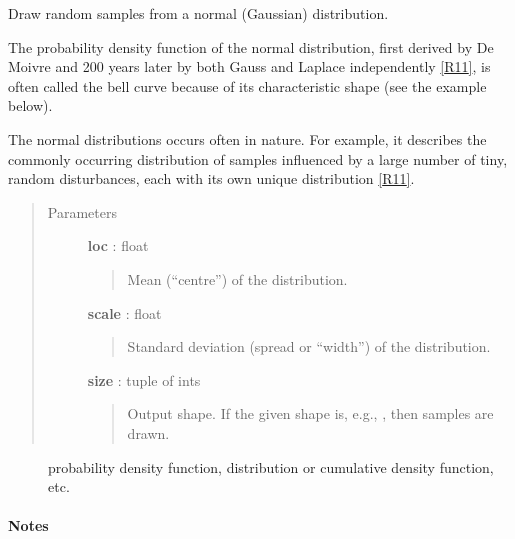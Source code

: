 \documentclass[letterpaper,10pt,english]{sphinxmanual}
\begin{document}
\begin{fulllineitems}
\label{index:halla.test.normal}
Draw random samples from a normal (Gaussian) distribution.

The probability density function of the normal distribution, first
derived by De Moivre and 200 years later by both Gauss and Laplace
independently {\hyperref[index:r11]{{[}R11{]}}}, is often called the bell curve because of
its characteristic shape (see the example below).

The normal distributions occurs often in nature.  For example, it
describes the commonly occurring distribution of samples influenced
by a large number of tiny, random disturbances, each with its own
unique distribution {\hyperref[index:r11]{{[}R11{]}}}.
\begin{quote}\begin{description}
\item[{Parameters}] \leavevmode
\textbf{loc} : float
\begin{quote}

Mean (``centre'') of the distribution.
\end{quote}

\textbf{scale} : float
\begin{quote}

Standard deviation (spread or ``width'') of the distribution.
\end{quote}

\textbf{size} : tuple of ints
\begin{quote}

Output shape.  If the given shape is, e.g., , then
 samples are drawn.
\end{quote}

\end{description}\end{quote}



\begin{description}
\item[{}] \leavevmode
probability density function, distribution or cumulative density function, etc.

\end{description}


\paragraph{Notes}


\end{fulllineitems}
\end{document}

